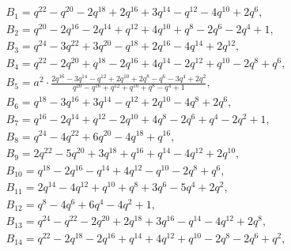 \documentclass[pdftex]{sigma}
\numberwithin{equation}{section}
\theoremstyle{definition}
\newcommand{\flac}[2]{#1}
\begin{document}
\begin{gather*}
 B_1 =
\flac{q^{22}}{a^2}-\flac{q^{20}}{a^2}-\flac{2q^{18}}{a^2}+\flac{2q^{16}}{a^2}+\flac{3q^{14}}{a^2}-\flac{q^{12}}{a^2}-\flac{4q^{10}}{a^2}+\flac{2q^{6}}{a^2}, \\
 B_2 =
\flac{q^{20}}{a^2}-\flac{2q^{16}}{a^2}-\flac{2q^{14}}{a^2}+\flac{q^{12}}{a^2}+\flac{4q^{10}}{a^2}+\flac{q^{8}}{a^2}-\flac{2q^{6}}{a^2}-\flac{2q^{4}}{a^2}+\flac{1}{a^2}, \\
 B_3 =
\flac{q^{24}}{a^2}-\flac{3q^{22}}{a^2}+\flac{3q^{20}}{a^2}-\flac{q^{18}}{a^2}+\flac{2q^{16}}{a^2}-\flac{4q^{14}}{a^2}+\flac{2q^{12}}{a^2}, \\
 B_4 =
\flac{q^{22}}{a^2}-\flac{2q^{20}}{a^2}+\flac{q^{18}}{a^2}-\flac{2q^{16}}{a^2}+\flac{4q^{14}}{a^2}-\flac{2q^{12}}{a^2}+\flac{q^{10}}{a^2}-\flac{2q^{8}}{a^2}+\flac{q^{6}}{a^2}, \\
 B_5 =
a^2 \cdot \frac{2q^{16}-3q^{14}-q^{12}+2q^{10}+2q^{8}-q^{6}-3q^{4}+2q^{2}}{q^{20}-q^{16}+q^{12}+q^{10}+q^{8}-q^{4}+1}, \\
 B_6 =
\flac{q^{18}}{a^2}-\flac{3q^{16}}{a^2}+\flac{3q^{14}}{a^2}-\flac{q^{12}}{a^2}+\flac{2q^{10}}{a^2}-\flac{4q^{8}}{a^2}+\flac{2q^{6}}{a^2}, \\
 B_7 =
\flac{q^{16}}{a^2}-\flac{2q^{14}}{a^2}+\flac{q^{12}}{a^2}-\flac{2q^{10}}{a^2}+\flac{4q^{8}}{a^2}-\flac{2q^{6}}{a^2}+\flac{q^{4}}{a^2}-\flac{2q^{2}}{a^2}+\flac{1}{a^2}, \\
 B_8 =
\flac{q^{24}}{a^2}-\flac{4q^{22}}{a^2}+\flac{6q^{20}}{a^2}-\flac{4q^{18}}{a^2}+\flac{q^{16}}{a^2}, \\
 B_9 =
\flac{2q^{22}}{a^2}-\flac{5q^{20}}{a^2}+\flac{3q^{18}}{a^2}+\flac{q^{16}}{a^2}+\flac{q^{14}}{a^2}-\flac{4q^{12}}{a^2}+\flac{2q^{10}}{a^2}, \\
 B_{10} =
\flac{q^{18}}{a^2}-\flac{2q^{16}}{a^2}-\flac{q^{14}}{a^2}+\flac{4q^{12}}{a^2}-\flac{q^{10}}{a^2}-\flac{2q^{8}}{a^2}+\flac{q^{6}}{a^2}, \\
 B_{11} =
\flac{2q^{14}}{a^2}-\flac{4q^{12}}{a^2}+\flac{q^{10}}{a^2}+\flac{q^{8}}{a^2}+\flac{3q^{6}}{a^2}-\flac{5q^{4}}{a^2}+\flac{2q^{2}}{a^2}, \\
 B_{12} =
\flac{q^{8}}{a^2}-\flac{4q^{6}}{a^2}+\flac{6q^{4}}{a^2}-\flac{4q^{2}}{a^2}+\flac{1}{a^2}, \\
 B_{13} =
\flac{q^{24}}{a^2}-\flac{q^{22}}{a^2}-\flac{2q^{20}}{a^2}+\flac{2q^{18}}{a^2}+\flac{3q^{16}}{a^2}-\flac{q^{14}}{a^2}-\flac{4q^{12}}{a^2}+\flac{2q^{8}}{a^2}, \\
 B_{14} =
\flac{q^{22}}{a^2}-\flac{2q^{18}}{a^2}-\flac{2q^{16}}{a^2}+\flac{q^{14}}{a^2}+\flac{4q^{12}}{a^2}+\flac{q^{10}}{a^2}-\flac{2q^{8}}{a^2}-\flac{2q^{6}}{a^2}+\flac{q^{2}}{a^2}, \\

\end{gather*}
\end{document}
